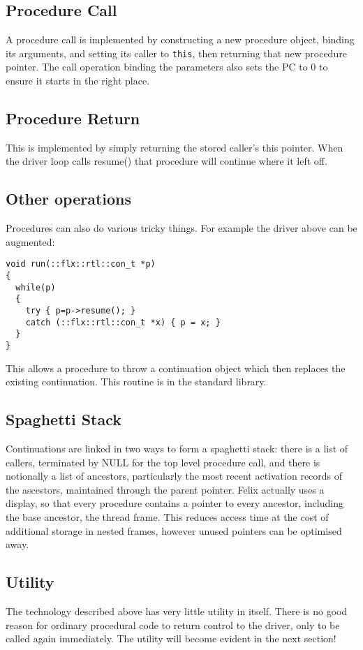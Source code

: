 \documentclass[oneside]{book}
\begin{document}
\subsection{Procedure Call}
A procedure call is implemented by constructing a new procedure object,
binding its arguments, and setting its caller to \verb$this$, then returning
that new procedure pointer. The call operation binding the parameters
also sets the PC to 0 to ensure it starts in the right place.

\subsection{Procedure Return}
This is implemented by simply returning the stored caller's this pointer.
When the driver loop calls resume() that procedure will continue where it left off.

\subsection{Other operations}
Procedures can also do various tricky things. For example the driver above
can be augmented:

\begin{verbatim}
void run(::flx::rtl::con_t *p)
{
  while(p)
  {
    try { p=p->resume(); }
    catch (::flx::rtl::con_t *x) { p = x; }
  }
}
\end{verbatim}

This allows a procedure to throw a continuation object which then replaces
the existing continuation. This routine is in the standard library.

\subsection{Spaghetti Stack}
Continuations are linked in two ways to form a spaghetti stack: there is a list
of callers, terminated by NULL for the top level procedure call, and there
is notionally a list of ancestors, particularly the most recent activation records
of the ascestors, maintained through the parent pointer. Felix actually uses a display,
so that every procedure contains a pointer to every ancestor, including the base
ancestor, the thread frame. This reduces access time at the cost of additional storage
in nested frames, however unused pointers can be optimised away.

\subsection{Utility}
The technology described above has very little utility in itself. There is
no good reason for ordinary procedural code to return control to the driver,
only to be called again immediately. The utility will become evident in
the next section!
\end{document}
